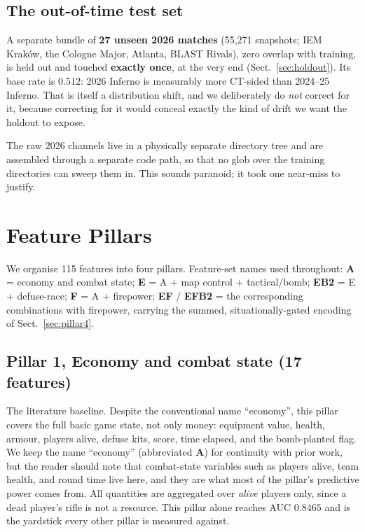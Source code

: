 \documentclass[11pt,a4paper]{article}
\begin{document}
\subsection{The out-of-time test set}
A separate bundle of \textbf{27 unseen 2026 matches} (55{,}271 snapshots; IEM Krak\'ow,
the Cologne Major, Atlanta, BLAST Rivals), zero overlap with training, is held out
and touched \textbf{exactly once}, at the very end (Sect.~\ref{sec:holdout}). Its base
rate is $0.512$: 2026 Inferno is measurably more CT-sided than 2024--25 Inferno. That is
itself a distribution shift, and we deliberately do \emph{not} correct for it, because
correcting for it would conceal exactly the kind of drift we want the holdout to expose.

The raw 2026 channels live in a physically separate directory tree and are assembled
through a separate code path, so that no glob over the training directories can sweep
them in. This sounds paranoid; it took one near-miss to justify.

\section{Feature Pillars}
\label{sec:features}

We organise 115 features into four pillars. Feature-set names used throughout:
\textbf{A} = economy and combat state; \textbf{E} = A + map control + tactical/bomb;
\textbf{EB2} = E + defuse-race; \textbf{F} = A + firepower; \textbf{EF} / \textbf{EFB2}
= the corresponding combinations with firepower, carrying the summed, situationally-gated
encoding of Sect.~\ref{sec:pillar4}.

\subsection{Pillar 1, Economy and combat state (17 features)}
\label{sec:pillar1}
The literature baseline. Despite the conventional name ``economy'', this pillar covers the
full basic game state, not only money: equipment value, health, armour, players alive,
defuse kits, score, time elapsed, and the bomb-planted flag. We keep the name ``economy''
(abbreviated \textbf{A}) for continuity with prior work, but the reader should note that
combat-state variables such as players alive, team health, and round time live here, and
they are what most of the pillar's predictive power comes from. All quantities are
aggregated over \emph{alive} players only, since a dead player's rifle is not a resource.
This pillar alone reaches AUC $0.8465$ and is the yardstick every other pillar is measured
against.
\end{document}
